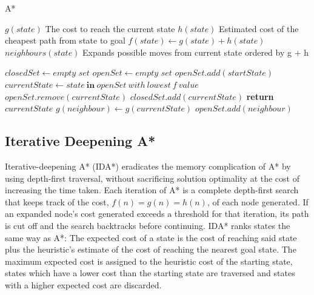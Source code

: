 \documentclass[final]{cmpreport}
\begin{document}
	\begin{algorithm}
	\caption{A*}\label{Astar}
	\begin{algorithmic}[1]
		\State $g(state)$ \Comment The cost to reach the current state
		\State $h(state)$ \Comment Estimated cost of the cheapest path from state to goal
		\State $f(state) \gets g(state)+h(state)$
		\State $neighbours(state)$ \Comment Expands possible moves from current state ordered by g + h
		
		\State $closedSet \gets \textit{empty set}$
		\State $openSet \gets \textit{empty set}$
		\State $openSet.add(startState)$
		\State $currentState \gets state\   \textbf{in}\ openSet\ with\ lowest\ f\ value$
		\State $openSet.remove(currentState)$
		\State $closedSet.add(currentState)$
		\State \textbf{return} $currentState$
		\EndIf
		\State$g(neighbour) \gets g(currentState)$
		\EndIf	
		\Else
		\State $openSet.add(neighbour)$	
		\EndIf
		\EndIf
		
		\EndFor
		\EndWhile
		\EndProcedure
	\end{algorithmic}
\end{algorithm}





\subsection{Iterative Deepening A*}
Iterative-deepening A* (IDA*) eradicates the memory complication of A* by using depth-first traversal, without sacrificing solution optimality at the cost of increasing the time taken. Each iteration of A* is a complete depth-first search that keeps track of the cost, $f(n) = g(n) = h(n)$, of each node generated. If an expanded node's cost generated exceeds a threshold for that iteration, its path is cut off and the search backtracks before continuing. IDA* ranks states the same way as A*: The expected cost of a state is the cost of reaching said state plus the heuristic's estimate of the cost of reaching the nearest goal state. The maximum expected cost is assigned to the heuristic cost of the starting state, states which have a lower cost than the starting state are traversed and states with a higher expected cost are discarded. 
\end{document}
